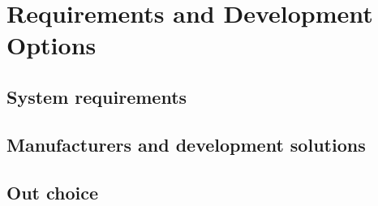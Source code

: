 \chapter{Requirements and Development Options}

\section{System requirements}

\section{Manufacturers and development solutions}

\section{Out choice}
